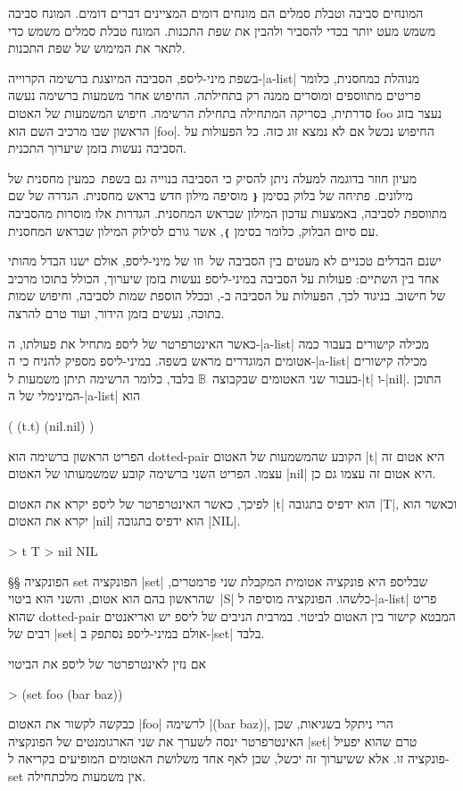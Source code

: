 המונחים סביבה וטבלת סמלים הם מונחים דומים המציינים דברים דומים. המונח סביבה
משמש מעט יותר בכדי להסביר ולהבין את שפת התכנות. המונח טבלת סמלים משמש
כדי לתאר את המימוש של שפת התכנות.

בשפת מיני-ליספ, הסביבה המיוצגת ברשימה הקרוייה-\E|a-list| מנוהלת כמחסנית, כלומר
פריטים מתווספים ומוסרים ממנה רק בתחילתה. החיפוש אחר משמעות ברשימה נעשה סדרתית,
בסריקה המתחילה בתחילת הרשימה. חיפוש המשמעות של האטום foo נעצר בזוג הראשון שבו
מרכיב השם הוא \E|foo|. החיפוש נכשל אם לא נמצא זוג כזה. כל הפעולות על הסביבה
נעשות בזמן שיערוך התכנית.

מעיון חוזר בדוגמה למעלה ניתן להסיק כי הסביבה בנוייה גם בשפת~\CPL כמעין מחסנית
של מילונים. פתיחה של בלוק בסימן \texttt{❴} מוסיפה מילון חדש בראש מחסנית. הגדרה
של שם מתווספת לסביבה, באמצעות עדכון המילון שבראש המחסנית. הגדרות אלו מוסרות
מהסביבה עם סיום הבלוק, כלומר בסימן \texttt{❵}, אשר גורם לסילוק המילון שבראש המחסנית.

ישנם הבדלים טכניים לא מעטים בין הסביבה של~\CPL וזו של מיני-ליספ, אולם ישנו הבדל
מהותי אחד בין השתיים: פעולות על הסביבה במיני-ליספ נעשות בזמן שיערוך, הכולל בתוכו
מרכיב של חישוב. בניגוד לכך, הפעולות על הסביבה ב-\CPL, ובכלל הוספת שמות לסביבה,
וחיפוש שמות בתוכה, נעשים בזמן הידור, ועוד טרם להרצה.

כאשר האינטרפרטר של ליספ מתחיל את פעולתו, ה-\E|a-list| מכילה קישורים בעבור כמה
אטומים המוגדרים מראש בשפה. במיני-ליספ מספיק להניח כי ה-\E|a-list| מכילה קישורים
בעבור שני האטומים שבקבוצה~$𝔹$ בלבד, כלומר הרשימה תיתן משמעות ל-\E|t| ו-\E|nil|.
התוכן המינימלי של ה-\E|a-list| הוא
\begin{LISP}
(
  (t.t)
  (nil.nil)
)
\end{LISP}

הפריט הראשון ברשימה הוא dotted-pair הקובע שהמשמעות של האטום \T|t| היא אטום זה
עצמו. הפריט השני ברשימה קובע שמשמעותו של האטום \T|nil| היא אטום זה עצמו גם כן.

לפיכך, כאשר האינטרפרטר של ליספ יקרא את האטום \T|t| הוא ידפיס בתגובה \T|T|,
וכאשר הוא יקרא את האטום \T|nil| הוא ידפיס בתגובה \T|NIL|.
\begin{LISP}
> t
T
> nil
NIL
\end{LISP}

§§ הפונקציה set
הפונקציה \T|set| שבליספ היא פונקציה אטומית המקבלת שני פרמטרים, שהראשון בהם
הוא אטום, והשני הוא ביטוי~\E|S| כלשהו. הפונקציה מוסיפה ל-\E|a-list| פריט שהוא
dotted-pair המבטא קישור בין האטום לביטוי. במרבית הניבים של ליספ יש ואריאנטים
רבים של \T|set| אולם במיני-ליספ נסתפק ב-\T|set| בלבד.

אם נזין לאינטרפרטר של ליספ את הביטוי
\begin{LISP}
> (set foo (bar baz))
\end{LISP}
כבקשה לקשור את האטום \T|foo| לרשימה \T|(bar baz)|, הרי ניתקל בשגיאות, שכן
האינטרפרטר ינסה לשערך את שני הארגומנטים של הפונקציה \E|set| טרם שהוא יפעיל
פונקציה זו. אלא ששיערוך זה יכשל, שכן לאף אחד משלושת האטומים המופיעים בקריאה
ל-set אין משמעות מלכתחילה.

